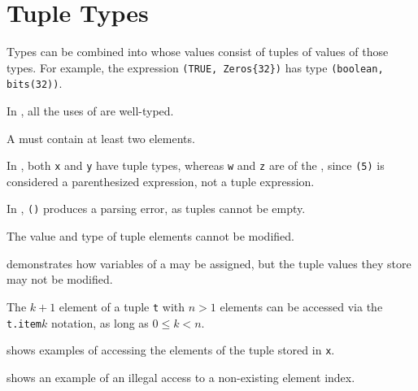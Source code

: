 \section{Tuple Types\label{sec:TupleTypes}}
\hypertarget{tupletypeterm}{}

Types can be combined into \tupletypesterm{} whose values consist of tuples of values of those types.
For example, the expression \verb|(TRUE, Zeros{32})| has type \verb|(boolean, bits(32))|.

In , all the uses of \tupletypesterm{} are well-typed.

A \tupletypeterm{} must contain at least two elements.

In , both \verb|x| and \verb|y| have tuple types,
whereas \verb|w| and \verb|z| are of the \integertypeterm, since \verb|(5)|
is considered a parenthesized expression, not a tuple expression.

In , \verb|()| produces a parsing error, as tuples cannot be empty.

The value and type of tuple elements cannot be modified.

 demonstrates how variables of a \tupletypeterm{} may be assigned,
but the tuple values they store may not be modified.

The $k+1$ element of a tuple \verb|t| with $n>1$ elements
can be accessed via the \texttt{t.item$k$} notation,
as long as $0 \leq k < n$.

 shows examples of accessing the elements
of the tuple stored in \verb|x|.

 shows an example of an illegal access to a non-existing
element index.

